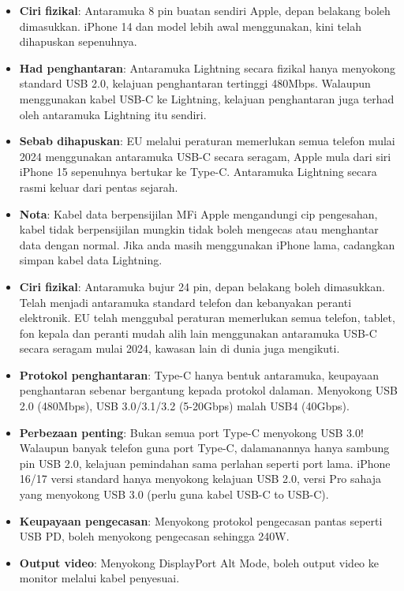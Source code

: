 \begin{itemize}
  \item \textbf{Ciri fizikal}: Antaramuka 8 pin buatan sendiri Apple, depan belakang boleh dimasukkan. iPhone 14 dan model lebih awal menggunakan, kini telah dihapuskan sepenuhnya.
  \item \textbf{Had penghantaran}: Antaramuka Lightning secara fizikal hanya menyokong standard USB 2.0, kelajuan penghantaran tertinggi 480Mbps. Walaupun menggunakan kabel USB-C ke Lightning, kelajuan penghantaran juga terhad oleh antaramuka Lightning itu sendiri.
  \item \textbf{Sebab dihapuskan}: EU melalui peraturan memerlukan semua telefon mulai 2024 menggunakan antaramuka USB-C secara seragam, Apple mula dari siri iPhone 15 sepenuhnya bertukar ke Type-C. Antaramuka Lightning secara rasmi keluar dari pentas sejarah.
  \item \textbf{Nota}: Kabel data berpensijilan MFi Apple mengandungi cip pengesahan, kabel tidak berpensijilan mungkin tidak boleh mengecas atau menghantar data dengan normal. Jika anda masih menggunakan iPhone lama, cadangkan simpan kabel data Lightning.
\end{itemize}


\begin{itemize}
  \item \textbf{Ciri fizikal}: Antaramuka bujur 24 pin, depan belakang boleh dimasukkan. Telah menjadi antaramuka standard telefon dan kebanyakan peranti elektronik. EU telah menggubal peraturan memerlukan semua telefon, tablet, fon kepala dan peranti mudah alih lain menggunakan antaramuka USB-C secara seragam mulai 2024, kawasan lain di dunia juga mengikuti.
  \item \textbf{Protokol penghantaran}: Type-C hanya bentuk antaramuka, keupayaan penghantaran sebenar bergantung kepada protokol dalaman. Menyokong USB 2.0 (480Mbps), USB 3.0/3.1/3.2 (5-20Gbps) malah USB4 (40Gbps).
  \item \textbf{Perbezaan penting}: Bukan semua port Type-C menyokong USB 3.0! Walaupun banyak telefon guna port Type-C, dalamanannya hanya sambung pin USB 2.0, kelajuan pemindahan sama perlahan seperti port lama. iPhone 16/17 versi standard hanya menyokong kelajuan USB 2.0, versi Pro sahaja yang menyokong USB 3.0 (perlu guna kabel USB-C to USB-C).
  \item \textbf{Keupayaan pengecasan}: Menyokong protokol pengecasan pantas seperti USB PD, boleh menyokong pengecasan sehingga 240W.
  \item \textbf{Output video}: Menyokong DisplayPort Alt Mode, boleh output video ke monitor melalui kabel penyesuai.
\end{itemize}

